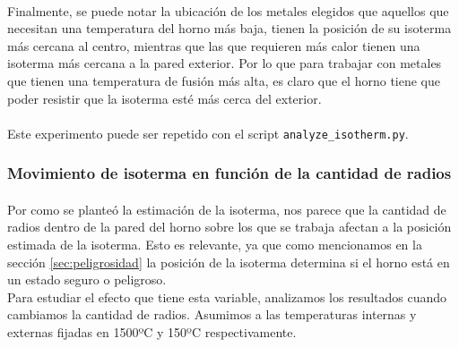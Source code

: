 \documentclass[12pt]{article}
\begin{document}
\paragraph{} Finalmente, se puede notar la ubicación de los metales elegidos que aquellos que necesitan una temperatura del horno más baja, tienen la posición de su isoterma más cercana al centro, mientras que las que requieren más calor tienen una isoterma más cercana a la pared exterior. Por lo que para trabajar con metales que tienen una temperatura de fusión más alta, es claro que el horno tiene que poder resistir que la isoterma esté más cerca del exterior.

\paragraph{} Este experimento puede ser repetido con el script \texttt{analyze\_isotherm.py}.

\subsubsection{Movimiento de isoterma en función de la cantidad de radios}

\paragraph{} Por como se planteó la estimación de la isoterma, nos parece que la cantidad de radios dentro de la pared del horno sobre los que se trabaja afectan a la posición estimada de la isoterma. Esto es relevante, ya que como mencionamos en la sección \ref{sec:peligrosidad} la posición de la isoterma determina si el horno está en un estado seguro o peligroso. \\
Para estudiar el efecto que tiene esta variable, analizamos los resultados cuando cambiamos la cantidad de radios. Asumimos a las temperaturas internas y externas fijadas en 1500ºC y 150ºC respectivamente. \\
\end{document}
